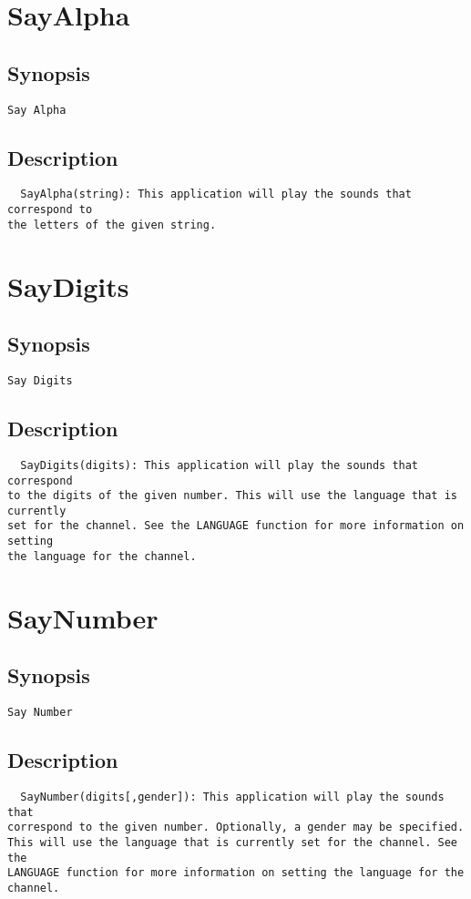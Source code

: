 \section{SayAlpha}
\subsection{Synopsis}
\begin{verbatim}
Say Alpha
\end{verbatim}
\subsection{Description}
\begin{verbatim}
  SayAlpha(string): This application will play the sounds that correspond to
the letters of the given string.

\end{verbatim}


\section{SayDigits}
\subsection{Synopsis}
\begin{verbatim}
Say Digits
\end{verbatim}
\subsection{Description}
\begin{verbatim}
  SayDigits(digits): This application will play the sounds that correspond
to the digits of the given number. This will use the language that is currently
set for the channel. See the LANGUAGE function for more information on setting
the language for the channel.

\end{verbatim}


\section{SayNumber}
\subsection{Synopsis}
\begin{verbatim}
Say Number
\end{verbatim}
\subsection{Description}
\begin{verbatim}
  SayNumber(digits[,gender]): This application will play the sounds that
correspond to the given number. Optionally, a gender may be specified.
This will use the language that is currently set for the channel. See the
LANGUAGE function for more information on setting the language for the channel.

\end{verbatim}


